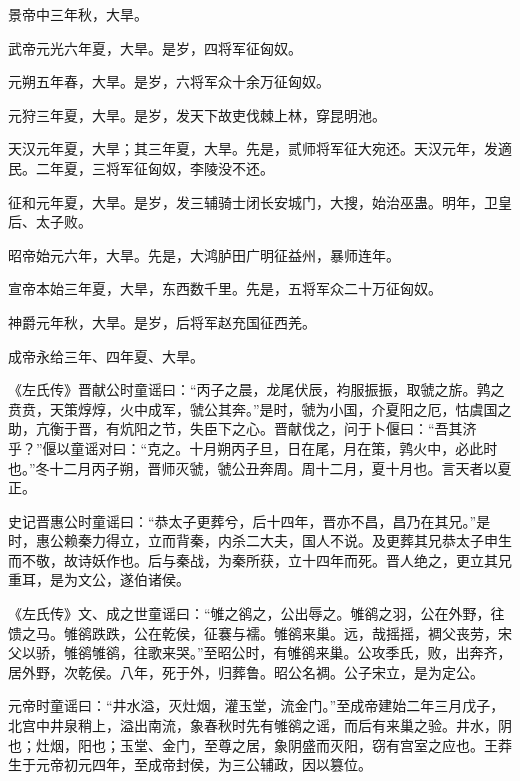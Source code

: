 \documentclass[12pt,UTF8]{ctexbook}
\begin{document}
景帝中三年秋，大旱。



武帝元光六年夏，大旱。是岁，四将军征匈奴。



元朔五年春，大旱。是岁，六将军众十余万征匈奴。



元狩三年夏，大旱。是岁，发天下故吏伐棘上林，穿昆明池。



天汉元年夏，大旱；其三年夏，大旱。先是，贰师将军征大宛还。天汉元年，发適民。二年夏，三将军征匈奴，李陵没不还。



征和元年夏，大旱。是岁，发三辅骑士闭长安城门，大搜，始治巫蛊。明年，卫皇后、太子败。



昭帝始元六年，大旱。先是，大鸿胪田广明征益州，暴师连年。



宣帝本始三年夏，大旱，东西数千里。先是，五将军众二十万征匈奴。



神爵元年秋，大旱。是岁，后将军赵充国征西羌。



成帝永给三年、四年夏、大旱。



《左氏传》晋献公时童谣曰：“丙子之晨，龙尾伏辰，袀服振振，取虢之旂。鹑之贲贲，天策焞焞，火中成军，虢公其奔。”是时，虢为小国，介夏阳之厄，怙虞国之助，亢衡于晋，有炕阳之节，失臣下之心。晋献伐之，问于卜偃曰：“吾其济乎？”偃以童谣对曰：“克之。十月朔丙子旦，日在尾，月在策，鹑火中，必此时也。”冬十二月丙子朔，晋师灭虢，虢公丑奔周。周十二月，夏十月也。言天者以夏正。



史记晋惠公时童谣曰：“恭太子更葬兮，后十四年，晋亦不昌，昌乃在其兄。”是时，惠公赖秦力得立，立而背秦，内杀二大夫，国人不说。及更葬其兄恭太子申生而不敬，故诗妖作也。后与秦战，为秦所获，立十四年而死。晋人绝之，更立其兄重耳，是为文公，遂伯诸侯。



《左氏传》文、成之世童谣曰：“雊之鹆之，公出辱之。雊鹆之羽，公在外野，往馈之马。雊鹆跌跌，公在乾侯，征褰与襦。雊鹆来巢。远，哉摇摇，裯父丧劳，宋父以骄，雊鹆雊鹆，往歌来哭。”至昭公时，有雊鹆来巢。公攻季氏，败，出奔齐，居外野，次乾侯。八年，死于外，归葬鲁。昭公名裯。公子宋立，是为定公。



元帝时童谣曰：“井水溢，灭灶烟，灌玉堂，流金门。”至成帝建始二年三月戊子，北宫中井泉稍上，溢出南流，象春秋时先有雊鹆之谣，而后有来巢之验。井水，阴也；灶烟，阳也；玉堂、金门，至尊之居，象阴盛而灭阳，窃有宫室之应也。王莽生于元帝初元四年，至成帝封侯，为三公辅政，因以篡位。
\end{document}
